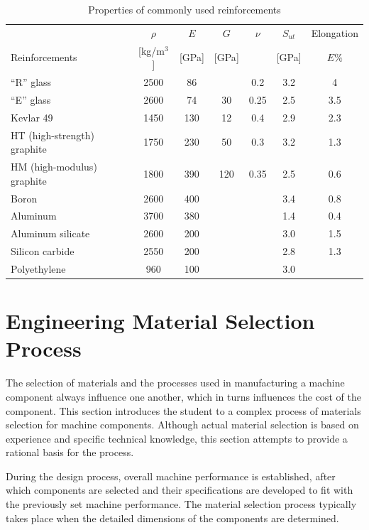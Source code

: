 \documentclass[
10pt,
a4paper,
openany,
svgnames,
]{book}
\begin{document}
\begin{table}[h]
  \centering
  \begin{tabular}{lcccccc}
    \toprule
                   & $\rho$         & $E$ & $G$       & $\nu$ & $S_{ut}$  & Elongation \\
    Reinforcements & {[}kg/m$^3${]} & {[}GPa{]} & {[}GPa{]} &       & {[}GPa{]} & $E\%$ \\
    \midrule
    ``R'' glass                 & 2500 & 86  &     & 0.2  & 3.2 & 4 \\
    ``E'' glass                 & 2600 & 74  & 30  & 0.25 & 2.5 & 3.5 \\
    Kevlar 49                   & 1450 & 130 & 12  & 0.4  & 2.9 & 2.3 \\
    HT (high-strength) graphite & 1750 & 230 & 50  & 0.3  & 3.2 & 1.3 \\
    HM (high-modulus) graphite  & 1800 & 390 & 120 & 0.35 & 2.5 & 0.6 \\
    Boron                       & 2600 & 400 &     &      & 3.4 & 0.8 \\
    Aluminum                    & 3700 & 380 &     &      & 1.4 & 0.4 \\
    Aluminum silicate           & 2600 & 200 &     &      & 3.0 & 1.5 \\
    Silicon carbide             & 2550 & 200 &     &      & 2.8 & 1.3 \\
    Polyethylene                & 960  & 100 &     &      & 3.0 & \\
    \bottomrule
  \end{tabular}
  \caption{Properties of commonly used reinforcements \cite{gay2014composite}}
  \label{tab: reinforcement props}
\end{table}

\section{Engineering Material Selection Process}

The selection of materials and the processes used in manufacturing a machine component always influence one another, which in turns influences the cost of the component. This section introduces the student to a complex process of materials selection for machine components. Although actual material selection is based on experience and specific technical knowledge, this section attempts to provide a rational basis for the process.

During the design process, overall machine performance is established, after which components are selected and their specifications are developed to fit with the previously set machine performance. The material selection process typically takes place when the detailed dimensions of the components are determined.
\end{document}
